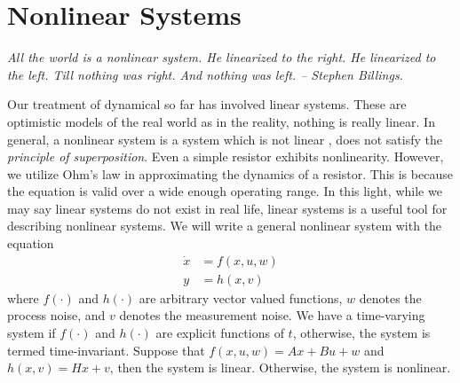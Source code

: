 \section{Nonlinear Systems}

\textit{All the world is a nonlinear system. He linearized to the right. He linearized to the left. Till nothing was right. And nothing was left. -- Stephen Billings.}

Our treatment of dynamical so far has involved linear systems. These are optimistic models of the real world as in the reality, nothing is really linear. In general, a nonlinear system is a system which is not linear \ie, does not satisfy the \textit{principle of superposition}. Even a simple resistor exhibits nonlinearity. However, we utilize Ohm's law in approximating the dynamics of a resistor. This is because the equation is valid over a wide enough operating range. In this light, while we may say linear systems do not exist in real life, linear systems is a useful tool for describing nonlinear systems. We will write a general nonlinear system with the equation
%
\begin{align}
	\dot{x} &= f(x, u, w) \nonumber \\
	y &= h(x, v)
\end{align}
%
where $f(\cdot)$ and $h(\cdot)$ are arbitrary vector valued functions, $w$ denotes the process noise, and $v$ denotes the measurement noise. We have a time-varying system if $f(\cdot)$ and $h(\cdot)$ are explicit functions of $t$, otherwise, the system is termed time-invariant. Suppose that $f(x, u, w) = Ax + Bu + w$ and $h(x,v) = Hx + v$, then the system is linear. Otherwise, the system is nonlinear.

